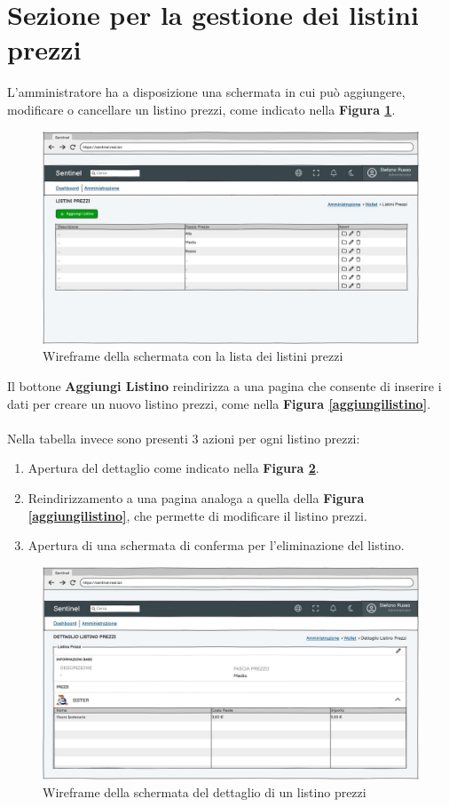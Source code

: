 \section{Sezione per la gestione dei listini prezzi}
L'amministratore ha a disposizione una schermata in cui pu\`o aggiungere, modificare o cancellare un listino prezzi, come indicato nella \textbf{Figura \ref{listalistini}}.
\begin{figure}[H]
  \centering
  \includegraphics[width=12cm]{images/gestione-listini/listini-prezzi-list.png}
  \caption{Wireframe della schermata con la lista dei listini prezzi}
  \label{listalistini}
\end{figure}
Il bottone \textbf{Aggiungi Listino} reindirizza a una pagina che consente di inserire i dati per creare un nuovo listino prezzi, come nella \textbf{Figura \ref{aggiungilistino}}.
\\\\
Nella tabella invece sono presenti 3 azioni per ogni listino prezzi:
\begin{enumerate}
  \item Apertura del dettaglio come indicato nella \textbf{Figura \ref{dettagliolistino}}.
  \item Reindirizzamento a una pagina analoga a quella della \textbf{Figura \ref{aggiungilistino}}, che permette di modificare il listino prezzi.
  \item Apertura di una schermata di conferma per l'eliminazione del listino.
\end{enumerate}

\begin{figure}[H]
  \centering
  \includegraphics[width=12cm]{images/gestione-listini/dettaglio-listino.png}
  \caption{Wireframe della schermata del dettaglio di un listino prezzi}
  \label{dettagliolistino}
\end{figure}

